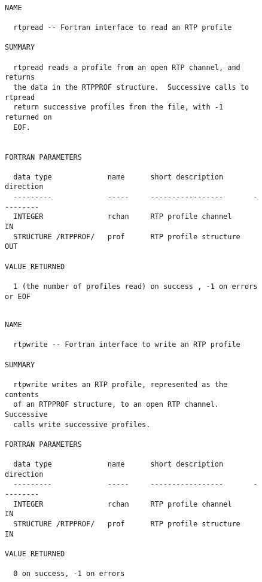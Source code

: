 \documentclass[12pt]{article}
\begin{document}
\begin{figure}
{\small
\begin{verbatim}

NAME    

  rtpread -- Fortran interface to read an RTP profile

SUMMARY

  rtpread reads a profile from an open RTP channel, and returns
  the data in the RTPPROF structure.  Successive calls to rtpread
  return successive profiles from the file, with -1 returned on
  EOF.


FORTRAN PARAMETERS

  data type             name      short description       direction
  ---------             -----     -----------------       ---------
  INTEGER               rchan     RTP profile channel         IN
  STRUCTURE /RTPPROF/   prof      RTP profile structure       OUT

VALUE RETURNED

  1 (the number of profiles read) on success , -1 on errors or EOF

\end{verbatim}
}
\end{figure}
\begin{figure}
{\small
\begin{verbatim}

NAME    

  rtpwrite -- Fortran interface to write an RTP profile

SUMMARY

  rtpwrite writes an RTP profile, represented as the contents
  of an RTPPROF structure, to an open RTP channel.  Successive
  calls write successive profiles.

FORTRAN PARAMETERS

  data type             name      short description       direction
  ---------             -----     -----------------       ---------
  INTEGER               rchan     RTP profile channel         IN
  STRUCTURE /RTPPROF/   prof      RTP profile structure       IN

VALUE RETURNED

  0 on success, -1 on errors

\end{verbatim}
}
\end{figure}
\end{document}
